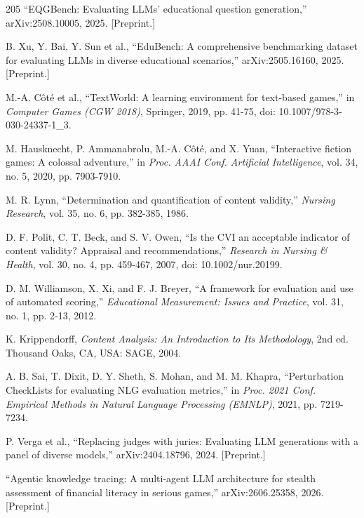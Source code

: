\begin{thebibliography}{205}
 ``EQGBench: Evaluating LLMs' educational question generation,'' arXiv:2508.\allowbreak{}10005, 2025. [Preprint.]

 B. Xu, Y. Bai, Y. Sun et al., ``EduBench: A comprehensive benchmarking dataset for evaluating LLMs in diverse educational scenarios,'' arXiv:2505.\allowbreak{}16160, 2025. [Preprint.]

 M.-A. Côté et al., ``TextWorld: A learning environment for text-based games,'' in \textit{Computer Games (CGW 2018)}, Springer, 2019, pp. 41-75, doi: 10.\allowbreak{}1007/\allowbreak{}978-\allowbreak{}3-\allowbreak{}030-\allowbreak{}24337-\allowbreak{}1\_\allowbreak{}3.

 M. Hausknecht, P. Ammanabrolu, M.-A. Côté, and X. Yuan, ``Interactive fiction games: A colossal adventure,'' in \textit{Proc. AAAI Conf. Artificial Intelligence}, vol. 34, no. 5, 2020, pp. 7903-7910.

 M. R. Lynn, ``Determination and quantification of content validity,'' \textit{Nursing Research}, vol. 35, no. 6, pp. 382-385, 1986.

 D. F. Polit, C. T. Beck, and S. V. Owen, ``Is the CVI an acceptable indicator of content validity? Appraisal and recommendations,'' \textit{Research in Nursing \& Health}, vol. 30, no. 4, pp. 459-467, 2007, doi: 10.\allowbreak{}1002/\allowbreak{}nur.\allowbreak{}20199.

 D. M. Williamson, X. Xi, and F. J. Breyer, ``A framework for evaluation and use of automated scoring,'' \textit{Educational Measurement: Issues and Practice}, vol. 31, no. 1, pp. 2-13, 2012.

 K. Krippendorff, \textit{Content Analysis: An Introduction to Its Methodology}, 2nd ed. Thousand Oaks, CA, USA: SAGE, 2004.

 A. B. Sai, T. Dixit, D. Y. Sheth, S. Mohan, and M. M. Khapra, ``Perturbation CheckLists for evaluating NLG evaluation metrics,'' in \textit{Proc. 2021 Conf. Empirical Methods in Natural Language Processing (EMNLP)}, 2021, pp. 7219-7234.

 P. Verga et al., ``Replacing judges with juries: Evaluating LLM generations with a panel of diverse models,'' arXiv:2404.\allowbreak{}18796, 2024. [Preprint.]

 ``Agentic knowledge tracing: A multi-agent LLM architecture for stealth assessment of financial literacy in serious games,'' arXiv:2606.\allowbreak{}25358, 2026. [Preprint.]


\end{thebibliography}

